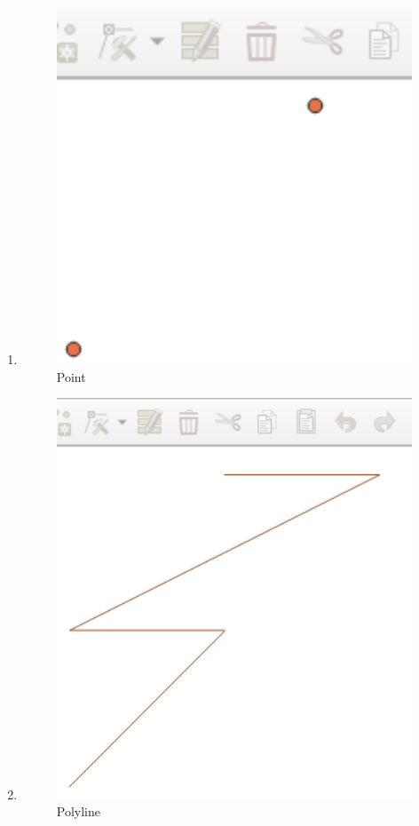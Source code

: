 \begin{enumerate}
	\item 
	
	\begin{figure}[H]
		\includegraphics[width=12cm]{figures/1174059/Python1/soal4.PNG}
		\centering
		\caption{Point}
	\end{figure}
	
	\item 
	
	\begin{figure}[H]
		\includegraphics[width=12cm]{figures/1174059/Python1/soal5.PNG}
		\centering
		\caption{Polyline}
	\end{figure}
	

\end{enumerate}
